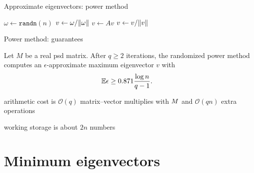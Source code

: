 \documentclass[presentation,xcolor={usenames,dvipsnames}]{beamer}
\begin{document}
\begin{frame}{Approximate eigenvectors: power method}

	\begin{algorithm}[H] %
	  \caption{\textsf{ApproxMaxEvec} via randomized power method}
	  \begin{algorithmic}[1]


	\vspace{0.5pc}


	  	\State	$\omega \gets \texttt{randn}(n)$ %
			\State	$v \gets \omega / \|\omega\|$
	  		\State	$v \gets A v$
				\State $v \gets v / \|v\|$
		\EndFor
		\State	{}
		\EndFunction

	\end{algorithmic}
	\end{algorithm}

\end{frame}

\begin{frame}{Power method: guarantees}

\begin{fact}
Let $M$ be a real psd matrix.
After $q \geq 2$ iterations, the randomized power method computes an
$\epsilon$-approximate maximum eigenvector $v$ with
\[
\mathbb E{} \epsilon \geq 0.871 \frac{\log n}{q-1}.
\]
\end{fact}

\vfill
\bit
\item arithmetic cost is $\mathcal{O}( q )$ matrix--vector multiplies with $M$ and $\mathcal{O}(q n)$ extra operations
\item working storage is about $2n$ numbers
\eit

\end{frame}

\section{Minimum eigenvectors}
\end{document}
